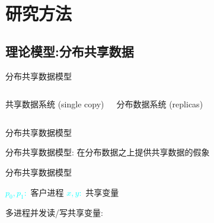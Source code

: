 \section{研究方法}

\subsection{理论模型:分布共享数据}

\begin{frame}{分布共享数据模型}
  \begin{columns}
	  \begin{center}
		共享数据系统 (single copy)
	  \end{center}
	\pause
	  \begin{center}
		分布数据系统 (replicas)
	  \end{center}
  \end{columns}
\end{frame}
\begin{frame}{分布共享数据模型}
  \begin{center}
	\textcolor{blue!80}{分布共享数据模型:} 在分布数据之上提供共享数据的假象
  \end{center}
\end{frame}
\begin{frame}{分布共享数据模型}
  \begin{center}
    \textcolor{cyan}{$p_0, p_1:$} 客户进程 \hspace{0.30cm} \textcolor{cyan}{$x, y:$} 共享变量 
  \end{center}
  \pause

  多进程并发读/写共享变量:
  
  \pause

  \begin{center}
  \end{center}

\end{frame}
